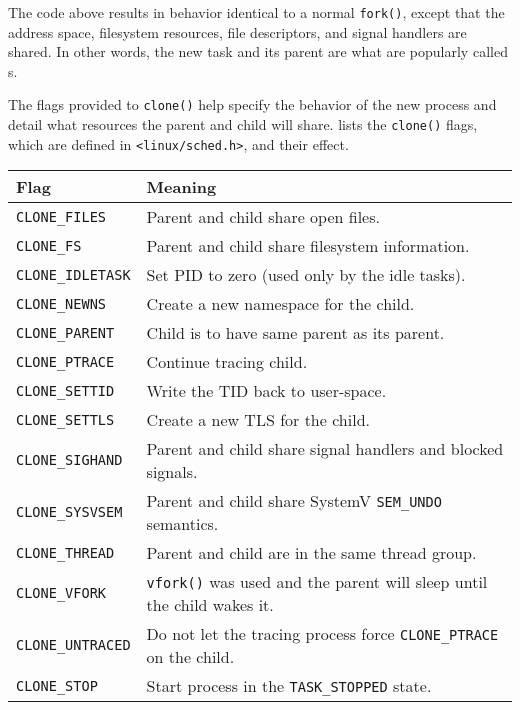 The code above results in behavior identical to a normal \texttt{fork()}, except that the address space, filesystem resources, file descriptors, and signal handlers are shared.
In other words, the new task and its parent are what are popularly called s.

The flags provided to \texttt{clone()} help specify the behavior of the new process and detail what resources the parent and child will share.
 lists the \texttt{clone()} flags, which are defined in \texttt{<linux/sched.h>}, and their effect.

\begin{table}[h!tbp]
  \centering
  \begin{tabular}{ll}
    \toprule
    \textbf{Flag} & \textbf{Meaning} \\
    \midrule
    \texttt{CLONE_FILES} & Parent and child share open files. \\
    \texttt{CLONE_FS} & Parent and child share filesystem information. \\
    \texttt{CLONE_IDLETASK} & Set PID to zero (used only by the idle tasks). \\
    \texttt{CLONE_NEWNS} & Create a new namespace for the child. \\
    \texttt{CLONE_PARENT} & Child is to have same parent as its parent. \\
    \texttt{CLONE_PTRACE} & Continue tracing child. \\
    \texttt{CLONE_SETTID} & Write the TID back to user-space. \\
    \texttt{CLONE_SETTLS} & Create a new TLS for the child. \\
    \texttt{CLONE_SIGHAND} & Parent and child share signal handlers and blocked signals. \\
    \texttt{CLONE_SYSVSEM} & Parent and child share SystemV \texttt{SEM\_UNDO} semantics. \\
    \texttt{CLONE_THREAD} & Parent and child are in the same thread group. \\
    \texttt{CLONE_VFORK} & \texttt{vfork()} was used and the parent will sleep until the child wakes it. \\
    \texttt{CLONE_UNTRACED} & Do not let the tracing process force \texttt{CLONE_PTRACE} on the child. \\
    \texttt{CLONE_STOP} & Start process in the \texttt{TASK_STOPPED} state. \\

\end{tabular}
\end{table}
